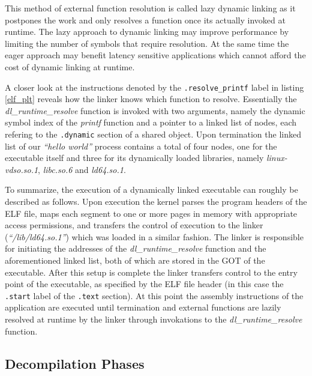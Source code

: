 \documentclass[12pt, a4paper]{article}
\begin{document}
This method of external function resolution is called lazy dynamic linking as it postpones the work and only resolves a function once its actually invoked at runtime. The lazy approach to dynamic linking may improve performance by limiting the number of symbols that require resolution. At the same time the eager approach may benefit latency sensitive applications which cannot afford the cost of dynamic linking at runtime.

A closer look at the instructions denoted by the \texttt{.resolve\_printf} label in listing \ref{elf_plt} reveals how the linker knows which function to resolve. Essentially the \textit{dl\_runtime\_resolve} function is invoked with two arguments, namely the dynamic symbol index of the \textit{printf} function and a pointer to a linked list of nodes, each refering to the \texttt{.dynamic} section of a shared object. Upon termination the linked list of our \textit{``hello world''} process contains a total of four nodes, one for the executable itself and three for its dynamically loaded libraries, namely \textit{linux-vdso.so.1}, \textit{libc.so.6} and \textit{ld64.so.1}.

To summarize, the execution of a dynamically linked executable can roughly be described as follows. Upon execution the kernel parses the program headers of the ELF file, maps each segment to one or more pages in memory with appropriate access permissions, and transfers the control of execution to the linker (\textit{``/lib/ld64.so.1''}) which was loaded in a similar fashion. The linker is responsible for initiating the addresses of the \textit{dl\_runtime\_resolve} function and the aforementioned linked list, both of which are stored in the GOT of the executable. After this setup is complete the linker transfers control to the entry point of the executable, as specified by the ELF file header (in this case the \texttt{.start} label of the \texttt{.text} section). At this point the assembly instructions of the application are executed until termination and external functions are lazily resolved at runtime by the linker through invokations to the \textit{dl\_runtime\_resolve} function.


\subsection{Decompilation Phases}
\end{document}
